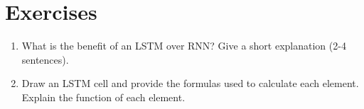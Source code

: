 \def\pathToRoot{.}


\usepackage{cleveref}

\def\issolution{}




\section*{Exercises}

\newcommand{\TODO}[1]{\textcolor{red}{TODO:#1}}

\begin{exercise}[Architecture][0.5 + 1.5 = 2]

\begin{enumerate}
	\item What is the benefit of an LSTM over RNN? Give a short explanation (2-4 sentences).
	\item Draw an LSTM cell and provide the formulas used to calculate each element. Explain
the function of each element.  
\end{enumerate}

\end{exercise}


